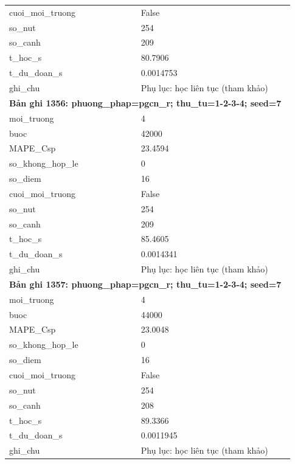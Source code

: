 \begin{longtable}{p{0.43\linewidth}p{0.50\linewidth}}
cuoi\_\allowbreak moi\_\allowbreak truong & False \\
so\_\allowbreak nut & 254 \\
so\_\allowbreak canh & 209 \\
t\_\allowbreak hoc\_\allowbreak s & 80.7906 \\
t\_\allowbreak du\_\allowbreak doan\_\allowbreak s & 0.0014753 \\
ghi\_\allowbreak chu & Phụ lục: học liên tục (tham khảo) \\
\midrule
\multicolumn{2}{p{0.95\linewidth}}{\textbf{Bản ghi 1356: phuong\_phap=pgcn\_r; thu\_tu=1-2-3-4; seed=7}} \\
moi\_\allowbreak truong & 4 \\
buoc & 42000 \\
MAPE\_\allowbreak Csp & 23.4594 \\
so\_\allowbreak khong\_\allowbreak hop\_\allowbreak le & 0 \\
so\_\allowbreak diem & 16 \\
cuoi\_\allowbreak moi\_\allowbreak truong & False \\
so\_\allowbreak nut & 254 \\
so\_\allowbreak canh & 209 \\
t\_\allowbreak hoc\_\allowbreak s & 85.4605 \\
t\_\allowbreak du\_\allowbreak doan\_\allowbreak s & 0.0014341 \\
ghi\_\allowbreak chu & Phụ lục: học liên tục (tham khảo) \\
\midrule
\multicolumn{2}{p{0.95\linewidth}}{\textbf{Bản ghi 1357: phuong\_phap=pgcn\_r; thu\_tu=1-2-3-4; seed=7}} \\
moi\_\allowbreak truong & 4 \\
buoc & 44000 \\
MAPE\_\allowbreak Csp & 23.0048 \\
so\_\allowbreak khong\_\allowbreak hop\_\allowbreak le & 0 \\
so\_\allowbreak diem & 16 \\
cuoi\_\allowbreak moi\_\allowbreak truong & False \\
so\_\allowbreak nut & 254 \\
so\_\allowbreak canh & 208 \\
t\_\allowbreak hoc\_\allowbreak s & 89.3366 \\
t\_\allowbreak du\_\allowbreak doan\_\allowbreak s & 0.0011945 \\
ghi\_\allowbreak chu & Phụ lục: học liên tục (tham khảo) \\

\end{longtable}
